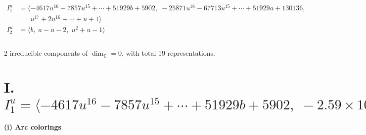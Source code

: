 \documentclass[1p]{elsarticle_modified}
\theoremstyle{definition}
\begin{document}
\begin{align*}
I^u_{1}&=\langle 
-4617 u^{16}-7857 u^{15}+\cdots+51929 b+5902,\;-25871 u^{16}-67713 u^{15}+\cdots+51929 a+130136,\\
\phantom{I^u_{1}}&\phantom{= \langle  }u^{17}+2 u^{16}+\cdots+u+1\rangle \\
I^u_{2}&=\langle 
b,\;a- u-2,\;u^2+u-1\rangle \\
\\
\end{align*}
\raggedright * 2 irreducible components of $\dim_{\mathbb{C}}=0$, with total 19 representations.\\
\newpage
\renewcommand{\arraystretch}{1}
\centering \section*{I. $I^u_{1}= \langle -4617 u^{16}-7857 u^{15}+\cdots+51929 b+5902,\;-2.59\times10^{4} u^{16}-6.77\times10^{4} u^{15}+\cdots+5.19\times10^{4} a+1.30\times10^{5},\;u^{17}+2 u^{16}+\cdots+u+1 \rangle$}
\flushleft \textbf{(i) Arc colorings}\\
\end{document}
